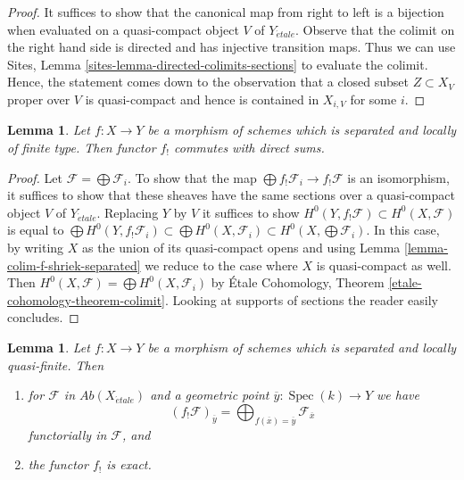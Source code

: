 \documentclass{stacks-project}
\theoremstyle{plain}
\newtheorem{lemma}[subsection]{Lemma}
\theoremstyle{definition}
\theoremstyle{remark}
\numberwithin{equation}{subsection}
\def\Spec{\mathop{\mathrm{Spec}}}
\def\etale{{\acute{e}tale}}
\begin{document}
\begin{proof}
It suffices to show that the canonical map from
right to left is a bijection when evaluated on a quasi-compact
object $V$ of $Y_\etale$.
Observe that the colimit on the right hand side is directed
and has injective transition maps.
Thus we can use
Sites, Lemma \ref{sites-lemma-directed-colimits-sections}
to evaluate the colimit. Hence, the statement comes down
to the observation that a closed subset $Z \subset X_V$ proper over $V$
is quasi-compact and hence is contained in $X_{i, V}$ for some $i$.
\end{proof}

\begin{lemma}
\label{lemma-f-shriek-separated-direct-sums}
Let $f : X \to Y$ be a morphism of schemes which is separated and
locally of finite type. Then functor $f_!$ commutes with direct sums.
\end{lemma}

\begin{proof}
Let $\mathcal{F} = \bigoplus \mathcal{F}_i$. To show that the map
$\bigoplus f_!\mathcal{F}_i \to f_!\mathcal{F}$ is an isomorphism,
it suffices to show that these sheaves have the same sections over
a quasi-compact object $V$ of $Y_\etale$. Replacing $Y$ by $V$
it suffices to show
$H^0(Y, f_!\mathcal{F}) \subset H^0(X, \mathcal{F})$
is equal to
$\bigoplus H^0(Y, f_!\mathcal{F}_i)
\subset \bigoplus H^0(X, \mathcal{F}_i)
\subset H^0(X, \bigoplus \mathcal{F}_i)$.
In this case, by writing $X$ as the union of its quasi-compact opens
and using Lemma \ref{lemma-colim-f-shriek-separated}
we reduce to the case where $X$ is quasi-compact as well.
Then $H^0(X, \mathcal{F}) = \bigoplus H^0(X, \mathcal{F}_i)$
by \'Etale Cohomology, Theorem \ref{etale-cohomology-theorem-colimit}.
Looking at supports of sections the reader easily concludes.
\end{proof}

\begin{lemma}
\label{lemma-lqf-f-shriek-separated-colimits}
Let $f : X \to Y$ be a morphism of schemes which is separated and
locally quasi-finite. Then
\begin{enumerate}
\item for $\mathcal{F}$ in $\textit{Ab}(X_\etale)$ and a geometric
point $\overline{y} : \Spec(k) \to Y$ we have
$$
(f_!\mathcal{F})_{\overline{y}} =
\bigoplus\nolimits_{f(\overline{x}) = \overline{y}} \mathcal{F}_{\overline{x}}
$$
functorially in $\mathcal{F}$, and
\item the functor $f_!$ is exact.
\end{enumerate}
\end{lemma}
\end{document}
